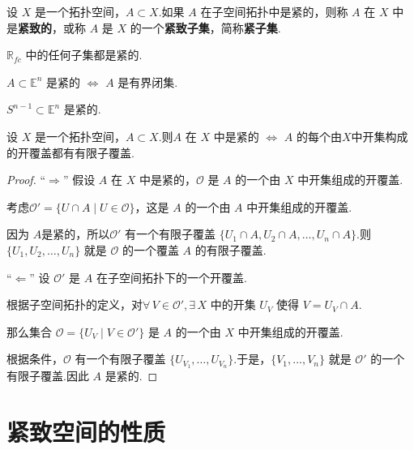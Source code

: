 \begin{definition}[紧致子集]
    设 $X$ 是一个拓扑空间，$A \subset X$.如果 $A$ 在子空间拓扑中是紧的，则称 $A$ 在 $X$ 中是\textbf{紧致的}，或称 $A$ 是 $X$ 的一个\textbf{紧致子集}，简称\textbf{紧子集}.
\end{definition}

\begin{instance}
    $\mathbb{R}_{fc}$ 中的任何子集都是紧的.
\end{instance}

\begin{instance}
    $A \subset \mathbb{E}^n$ 是紧的 $\iff$ $A$ 是有界闭集.
\end{instance}

\begin{instance}
    $S^{n-1} \subset \mathbb{E}^n$ 是紧的.
\end{instance}

\begin{lemma}[子空间紧性的等价描述]
    设 $X$ 是一个拓扑空间，$A \subset X$.则$A$ 在 $X$ 中是紧的 $\iff$ $A$ 的每个由$X$中开集构成的开覆盖都有有限子覆盖.
\end{lemma}
\begin{proof}
    “$\Rightarrow$” 假设 $A$ 在 $X$ 中是紧的，$\mathcal{O}$ 是 $A$ 的一个由 $X$ 中开集组成的开覆盖.\par
    考虑$\mathcal{O}' = \{U \cap A \mid U \in \mathcal{O}\}$，这是 $A$ 的一个由 $A$ 中开集组成的开覆盖.\par
    因为 $A$是紧的，所以$\mathcal{O}'$ 有一个有限子覆盖 $\{U_1 \cap A, U_2 \cap A, \dots, U_n \cap A\}$.则$\{U_1, U_2, \dots, U_n\}$ 就是 $\mathcal{O}$ 的一个覆盖 $A$ 的有限子覆盖.

    “$\Leftarrow$” 设 $\mathcal{O}'$ 是 $A$ 在子空间拓扑下的一个开覆盖.\par
    根据子空间拓扑的定义，对$\forall\,V \in \mathcal{O}',\exists\, X$ 中的开集 $U_V$ 使得 $V = U_V \cap A$.\par
    那么集合 $\mathcal{O} = \{U_V \mid V \in \mathcal{O}'\}$ 是 $A$ 的一个由 $X$ 中开集组成的开覆盖.\par
    根据条件，$\mathcal{O}$ 有一个有限子覆盖 $\{U_{V_1}, \dots, U_{V_n}\}$.于是，$\{V_1, \dots, V_n\}$ 就是 $\mathcal{O}'$ 的一个有限子覆盖.因此 $A$ 是紧的.
\end{proof}


\section{紧致空间的性质}

